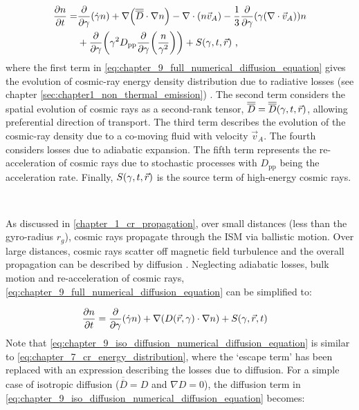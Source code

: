 \begin{equation}
    \begin{aligned}
        \pdv{n}{t}=&\pdv{ }{\gamma}\qty(\dot{\gamma}n)+\nabla\qty(\overline{\overline{D}}\cdot\nabla n)-\nabla\cdot\qty(n\vec{v}_A)-\frac{1}{3}\pdv{ }{\gamma}\qty(\gamma\qty(\nabla\cdot\vec{v}_A))n \\
        &+\pdv{ }{\gamma}\qty(\gamma^2 D_\mathrm{pp}\pdv{ }{\gamma}\qty(\frac{n}{\gamma^2})) + S\qty(\gamma,t,\vec{r})  \text{ ,}     
    \end{aligned} \label{eq:chapter_9_full_numerical_diffusion_equation}
\end{equation} 
\noindent where the first term in \autoref{eq:chapter_9_full_numerical_diffusion_equation} gives the evolution of cosmic-ray energy density distribution due to radiative losses (see chapter \autoref{sec:chapter1_non_thermal_emission}) . The second term considers the spatial evolution of cosmic rays as a second-rank tensor, $\overline{\overline{D}}=\overline{\overline{D}}\qty(\gamma,t,\vec{r})$, allowing preferential direction of transport. The third term describes the evolution of the cosmic-ray density due to a co-moving fluid with velocity $\vec{v}_A$. The fourth considers losses due to adiabatic expansion. The fifth term represents the re-acceleration of cosmic rays due to stochastic processes with $D_\mathrm{pp}$ being the acceleration rate. Finally, $S\qty(\gamma,t,\vec{r})$ is the source term of high-energy cosmic rays.
\par~\par
As discussed in \autoref{chapter_1_cr_propagation}, over small distances (less than the gyro-radius $r_g$), cosmic rays propagate through the ISM via ballistic motion. Over large distances, cosmic rays scatter off magnetic field turbulence and the overall propagation can be described by diffusion \citep{2015PhRvD..92h3003P}. Neglecting adiabatic losses, bulk motion and re-acceleration of cosmic rays, \autoref{eq:chapter_9_full_numerical_diffusion_equation} can be simplified to:


\begin{equation}
\begin{aligned}
\pdv{n}{t}&=\pdv{ }{\gamma}\qty(\dot{\gamma}n) + \nabla\qty(D\qty(\vec{r},\gamma)\cdot \nabla n) + S\qty(\gamma,\vec{r},t)
\end{aligned} \label{eq:chapter_9_iso_diffusion_numerical_diffusion_equation}
\end{equation} 
\noindent Note that \autoref{eq:chapter_9_iso_diffusion_numerical_diffusion_equation} is similar to \autoref{eq:chapter_7_cr_energy_distribution}, where the `escape term' has been replaced with an expression describing the losses due to diffusion. For a simple case of isotropic diffusion ($\overline{\overline{D}}=D$ and $\nabla D=0$), the diffusion term in \autoref{eq:chapter_9_iso_diffusion_numerical_diffusion_equation} becomes: 

